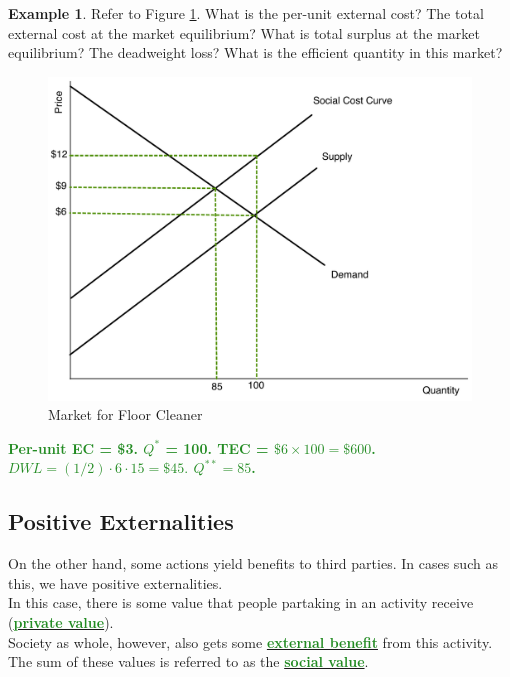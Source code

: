 \documentclass[11pt]{article}\usepackage[]{graphicx}\usepackage[]{color}
\theoremstyle{definition}
\newtheorem{exmp}{Example}[section]
\newcommand{\ddp}[1]{{\textbf{\textcolor{ForestGreen}{#1}}}}
\newcommand{\dd}[1]{{\underline{\textbf{\textcolor{ForestGreen}{#1}}}}}
\begin{document}
	\begin{exmp} 
		Refer to Figure \ref{fig4}. What is the per-unit external cost? The total external cost at the market equilibrium? What is total surplus at the market equilibrium? The deadweight loss? What is the efficient quantity in this market?
	
	\begin{figure}[ht!]
		\centering
		\includegraphics[scale=.45]{notes06_plot1.pdf}
		\caption{Market for Floor Cleaner}
		\label{fig4}
	\end{figure}
	\end{exmp}
	
	\ddp{Per-unit EC = \$3. $Q^*$ = 100. TEC = $\$6\times 100 = \$600$. $DWL = (1/2)\cdot6\cdot15 = \$45.$ $Q^{**} = 85$. }
	
	\subsection{Positive Externalities}
	
	On the other hand, some actions yield benefits to third parties. In cases such as this, we have positive externalities.
	\\
	
	In this case, there is some value that people partaking in an activity receive (\dd{private value}).
	\\
	
	Society as whole, however, also gets some \dd{external benefit} from this activity. The sum of these values is referred to as the \dd{social value}. 
	\\
	
\end{document}
